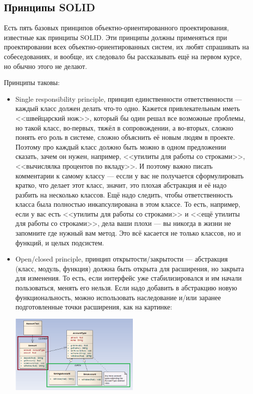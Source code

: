 \documentclass[a5paper]{article}
\begin{document}
\subsection{Принципы SOLID}

Есть пять базовых принципов объектно-ориентированного проектирования, известные как принципы SOLID. Эти принципы должны применяться при проектировании всех объектно-ориентированных систем, их любят спрашивать на собеседованиях, и вообще, их следовало бы рассказывать ещё на первом курсе, но обычно этого не делают.

Принципы таковы:

\begin{itemize}
    \item Single responsibility principle, принцип единственности ответственности --- каждый класс должен делать что-то одно. Кажется привлекательным иметь <<швейцарский нож>>, который бы один решал все возможные проблемы, но такой класс, во-первых, тяжёл в сопровождении, а во-вторых, сложно понять его роль в системе, сложно объяснить её новым людям в проекте. Поэтому про каждый класс должно быть можно в одном предложении сказать, зачем он нужен, например, <<утилиты для работы со строками>>, <<вычислялка процентов по вкладу>>. И поэтому важно писать комментарии к самому классу --- ессли у вас не получается сформулировать кратко, что делает этот класс, значит, это плохая абстракция и её надо разбить на несколько классов. Ещё надо следить, чтобы ответственность класса была полностью инкапсулирована в этом классе. То есть, например, если у вас есть <<утилиты для работы со строками>> и <<ещё утилиты для работы со строками>>, дела ваши плохи --- вы никогда в жизни не запомните где нужный вам метод. Это всё касается не только классов, но и функций, и целых подсистем.
    \item Open/closed principle, принцип открытости/закрытости --- абстракция (класс, модуль, функция) должна быть открыта для расширения, но закрыта для изменения. То есть, если интерфейс уже стабилизировался и им начали пользоваться, менять его нельзя. Если надо добавить в абстракцию новую функциональность, можно использовать наследование и/или заранее подготовленные точки расширения, как на картинке:
        \begin{center}
            \includegraphics[width=0.5\textwidth]{openClosedPrinciple.png}
        \end{center}


\end{itemize}
\end{document}
